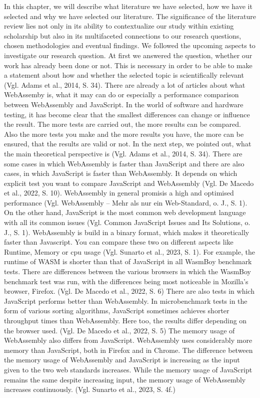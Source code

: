 In this chapter, we will describe what literature we have selected, how we have it selected and why we have selected our literature. 
The significance of the literature review lies not only in its ability to contextualize our study within existing scholarship but also in its multifaceted connections to our research questions, chosen methodologies and eventual findings. We followed the upcoming aspects to investigate our research question.
At first we answered the question, whether our work has already been done or not. This is necessary in order to be able to make a statement about how and whether the selected topic is scientifically relevant (Vgl. Adams et al., 2014, S. 34). There are already a lot of articles about what WebAssemby is, what it may can do or especially a performance comparison between WebAssembly and JavaScript. In the world of software and hardware testing, it has become clear that the smallest differences can change or influence the result. The more tests are carried out, the more results can be compared. Also the more tests you make and the more results you have, the more can be ensured, that the results are valid or not.
In the next step, we pointed out, what the main theoretical perspective is (Vgl. Adams et al., 2014, S. 34). There are some cases in which WebAssembly is faster than JavaScript and there are also cases, in which JavaScript is faster than WebAssembly. It depends on which explicit test you want to compare JavaScript and WebAssembly (Vgl. De Macedo et al., 2022, S. 10). WebAssembly in general promisis a high and optimised performance (Vgl. WebAssembly – Mehr als nur ein Web-Standard, o. J., S. 1). On the other hand, JavaScript is the most common web development language with all its common issues (Vgl. Common JavaScript Issues and Its Solutions, o. J., S. 1). WebAssembly is build in a binary format, which makes it theoretically faster than Javascript. You can compare these two  on different aspects like Runtime, Memory or cpu usage (Vgl. Sunarto et al., 2023, S. 1). For example, the runtime of WASM is shorter than that of JavaScript in all WasmBoy benchmark tests. There are differences between the various browsers in which the WasmBoy benchmark test was run, with the differences being most noticeable in Mozilla's browser, Firefox. (Vgl. De Macedo et al., 2022, S. 6) There are also tests in which JavaScript performs better than WebAssembly. In microbenchmark tests in the form of various sorting algorithms, JavaScript sometimes achieves shorter throughput times than WebAssembly. Here too, the results differ depending on the browser used. (Vgl. De Macedo et al., 2022, S. 5) The memory usage of WebAssembly also differs from JavaScript. WebAssembly uses considerably more memory than JavaScript, both in Firefox and in Chrome. The difference between the memory usage of WebAssembly and JavaScript is increasing as the input given to the two web standards increases. While the memory usage of JavaScript remains the same despite increasing input, the memory usage of WebAssembly increases continuously. (Vgl. Sunarto et al., 2023, S. 4f.)
